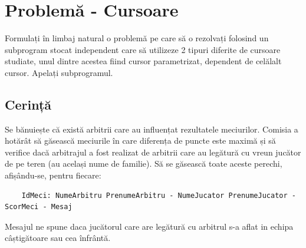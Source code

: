 \documentclass{article}
\begin{document}
\section{Problemă - Cursoare}
	Formulați în limbaj natural o problemă pe care să o rezolvați folosind un subprogram stocat
	independent care să utilizeze 2 tipuri diferite de cursoare studiate, unul dintre acestea fiind cursor
	parametrizat, dependent de celălalt cursor. Apelați subprogramul.
	
\subsection{Cerință}
Se bănuiește că există arbitrii care au influențat rezultatele meciurilor. 
Comisia a hotărât să găsească meciurile în care diferența de puncte este maximă și să verifice dacă arbitrajul a fost realizat de arbitrii care au legătură cu vreun jucător de pe teren (au același nume de familie).
Să se găsească toate aceste perechi, afișându-se, pentru fiecare:
\begin{verbatim}
	IdMeci: NumeArbitru PrenumeArbitru - NumeJucator PrenumeJucator - ScorMeci - Mesaj
\end{verbatim}
Mesajul ne spune daca jucătorul care are legătură cu arbitrul s-a aflat in echipa câștigătoare sau cea înfrântă.
\end{document}
